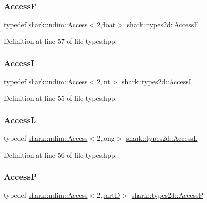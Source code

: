\subsubsection{\texorpdfstring{AccessF}{AccessF}}
{\footnotesize\ttfamily typedef \hyperlink{classshark_1_1ndim_1_1_access}{shark\+::ndim\+::\+Access}$<$2,float$>$ \hyperlink{namespaceshark_1_1types2d_a6fb40d33e103ffc80e690a4113ead47e}{shark\+::types2d\+::\+AccessF}}



Definition at line 57 of file types.\+hpp.

\hypertarget{namespaceshark_1_1types2d_ab507e903a99e375ac01fed59caa31c59}{}\label{namespaceshark_1_1types2d_ab507e903a99e375ac01fed59caa31c59} 
\subsubsection{\texorpdfstring{AccessI}{AccessI}}
{\footnotesize\ttfamily typedef \hyperlink{classshark_1_1ndim_1_1_access}{shark\+::ndim\+::\+Access}$<$2,int$>$ \hyperlink{namespaceshark_1_1types2d_ab507e903a99e375ac01fed59caa31c59}{shark\+::types2d\+::\+AccessI}}



Definition at line 55 of file types.\+hpp.

\hypertarget{namespaceshark_1_1types2d_a95d0053232dee1b2413e9de79f157a32}{}\label{namespaceshark_1_1types2d_a95d0053232dee1b2413e9de79f157a32} 
\subsubsection{\texorpdfstring{AccessL}{AccessL}}
{\footnotesize\ttfamily typedef \hyperlink{classshark_1_1ndim_1_1_access}{shark\+::ndim\+::\+Access}$<$2,long$>$ \hyperlink{namespaceshark_1_1types2d_a95d0053232dee1b2413e9de79f157a32}{shark\+::types2d\+::\+AccessL}}



Definition at line 56 of file types.\+hpp.

\hypertarget{namespaceshark_1_1types2d_a73db0c29a8a46ed6b1778768179d89c8}{}\label{namespaceshark_1_1types2d_a73db0c29a8a46ed6b1778768179d89c8} 
\subsubsection{\texorpdfstring{AccessP}{AccessP}}
{\footnotesize\ttfamily typedef \hyperlink{classshark_1_1ndim_1_1_access}{shark\+::ndim\+::\+Access}$<$2,\hyperlink{namespaceshark_1_1types2d_a87ef5d69759f5e1abf90fa90d89ff15c}{partD}$>$ \hyperlink{namespaceshark_1_1types2d_a73db0c29a8a46ed6b1778768179d89c8}{shark\+::types2d\+::\+AccessP}}



